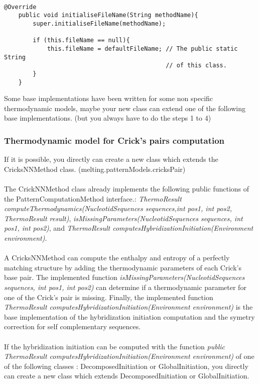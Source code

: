 \documentclass{article}
\begin{document}
\begin{verbatim}

@Override
	public void initialiseFileName(String methodName){
		super.initialiseFileName(methodName);
		
		if (this.fileName == null){
			this.fileName = defaultFileName; // The public static String
			                                 // of this class.
		}
	}

\end{verbatim}

Some base implementations have been written for some non specific thermodynamic models, maybe your new
class can extend one of the following base implementations. (but you always have to do the steps 1 to 4)

\subsubsection{Thermodynamic model for Crick's pairs computation}

If it is possible, you directly can create a new class which extends the CricksNNMethod class. (melting.patternModels.cricksPair) \\
\\
The CrickNNMethod class already implements the following public functions of the PatternComputationMethod interface.: 
\textit{ThermoResult computeThermodynamics(NucleotidSequences sequences,int pos1, int pos2, ThermoResult result)},
\textit{isMissingParameters(NucleotidSequences sequences, int pos1, int pos2)}, 
and \textit{ThermoResult computesHybridizationInitiation(Environment environment)}. \\
\\
A CricksNNMethod can compute the enthalpy and entropy of a perfectly matching structure by adding
the thermodynamic parameters of each Crick's base pair. The implemented function
\textit{isMissingParameters(NucleotidSequences sequences, int pos1, int pos2)} can determine if
a thermodynamic parameter for one of the Crick's pair is missing. Finally, the implemented function
\textit{ThermoResult computesHybridizationInitiation(Environment environment)} is the base implementation
of the hybridization initiation computation and the symetry correction for self complementary sequences.\\
\\

If the hybridization initiation can be computed with the function 
\textit{public ThermoResult computesHybridizationInitiation(Environment environment)} of one of the
following classes : DecomposedInitiation or GlobalInitiation, you directly can create a new class
which extends DecomposedInitiation or GlobalInitiation.
\end{document}
